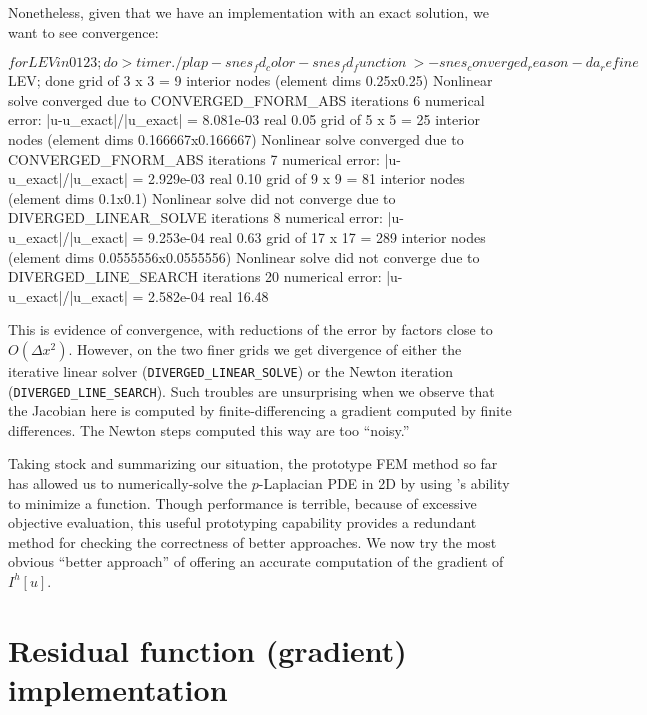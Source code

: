 Nonetheless, given that we have an implementation with an exact solution, we want to see convergence:
\begin{cline}
$ for LEV in 0 1 2 3; do
> timer ./plap -snes_fd_color -snes_fd_function \
>   -snes_converged_reason -da_refine $LEV; done
grid of 3 x 3 = 9 interior nodes (element dims 0.25x0.25)
Nonlinear solve converged due to CONVERGED_FNORM_ABS iterations 6
numerical error:  |u-u_exact|/|u_exact| = 8.081e-03
real 0.05
grid of 5 x 5 = 25 interior nodes (element dims 0.166667x0.166667)
Nonlinear solve converged due to CONVERGED_FNORM_ABS iterations 7
numerical error:  |u-u_exact|/|u_exact| = 2.929e-03
real 0.10
grid of 9 x 9 = 81 interior nodes (element dims 0.1x0.1)
Nonlinear solve did not converge due to DIVERGED_LINEAR_SOLVE iterations 8
numerical error:  |u-u_exact|/|u_exact| = 9.253e-04
real 0.63
grid of 17 x 17 = 289 interior nodes (element dims 0.0555556x0.0555556)
Nonlinear solve did not converge due to DIVERGED_LINE_SEARCH iterations 20
numerical error:  |u-u_exact|/|u_exact| = 2.582e-04
real 16.48
\end{cline}
This is evidence of convergence, with reductions of the error by factors close to $O(\Delta x^2)$.  However, on the two finer grids we get divergence of either the iterative linear solver (\texttt{DIVERGED\_LINEAR\_SOLVE}) or the Newton iteration (\texttt{DIVERGED\_LINE\_SEARCH}).  Such troubles are unsurprising when we observe that the Jacobian here is computed by finite-differencing a gradient computed by finite differences.  The Newton steps computed this way are too ``noisy.''

Taking stock and summarizing our situation, the prototype FEM method so far has allowed us to numerically-solve the $p$-Laplacian PDE in 2D by using \PETSc's ability to minimize a function.  Though performance is terrible, because of excessive objective evaluation, this useful prototyping capability provides a redundant method for checking the correctness of better approaches.  We now try the most obvious ``better approach'' of offering \PETSc an accurate computation of the gradient of $I^h[u]$.


\section{Residual function (gradient) implementation}

